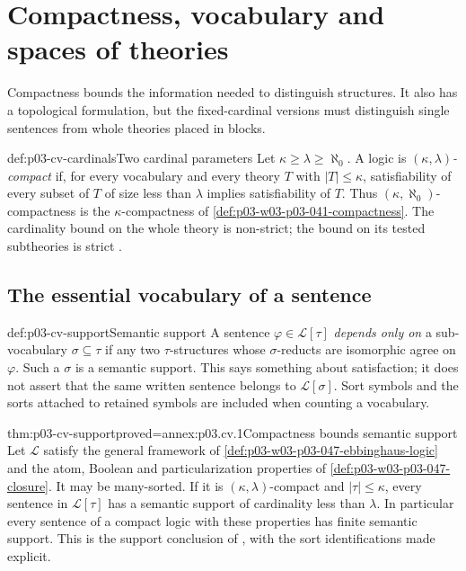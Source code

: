 \section{Compactness, vocabulary and spaces of theories}
\label{sec:p03-compactness-vocabulary}

Compactness bounds the information needed to distinguish structures.
It also has a topological formulation, but the fixed-cardinal versions
must distinguish single sentences from whole theories placed in blocks.

\begin{hbdefinition}{def:p03-cv-cardinals}{Two cardinal parameters}
Let \(\kappa\geq\lambda\geq\aleph_0\). A logic is
\emph{\((\kappa,\lambda)\)-compact} if, for every vocabulary and
every theory \(T\) with \(|T|\leq\kappa\), satisfiability of
every subset of \(T\) of size less than \(\lambda\) implies
satisfiability of \(T\). Thus \((\kappa,\aleph_0)\)-compactness
is the \(\kappa\)-compactness of
\cref{def:p03-w03-p03-041-compactness}.
The cardinality bound on the whole theory is non-strict; the bound
on its tested subtheories is strict
\cite[Ch.~II, Definition~5.1.1, p.~59]{Ebbinghaus1985ExtendedLogics}.
\end{hbdefinition}

\subsection{The essential vocabulary of a sentence}

\begin{hbdefinition}{def:p03-cv-support}{Semantic support}
A sentence \(\varphi\in\mathscr L[\tau]\) \emph{depends only on}
a sub-vocabulary \(\sigma\subseteq\tau\) if any two
\(\tau\)-structures whose \(\sigma\)-reducts are isomorphic agree
on \(\varphi\). Such a \(\sigma\) is a semantic support.
This says something about satisfaction; it does not assert that the
same written sentence belongs to \(\mathscr L[\sigma]\).
Sort symbols and the sorts attached to retained symbols are included
when counting a vocabulary.
\end{hbdefinition}

\begin{hbtheorem}{thm:p03-cv-support}{proved=annex:p03.cv.1}{Compactness bounds semantic support}
Let \(\mathscr L\) satisfy the general framework of
\cref{def:p03-w03-p03-047-ebbinghaus-logic} and the atom, Boolean
and particularization properties of
\cref{def:p03-w03-p03-047-closure}. It may be many-sorted.
If it is \((\kappa,\lambda)\)-compact and \(|\tau|\leq\kappa\),
every sentence in \(\mathscr L[\tau]\) has a semantic support
of cardinality less than \(\lambda\).
In particular every sentence of a compact logic with these properties
has finite semantic support. This is the support conclusion of
\cite[Ch.~II, Proposition~5.1.2, p.~60]{Ebbinghaus1985ExtendedLogics},
with the sort identifications made explicit.
\end{hbtheorem}

